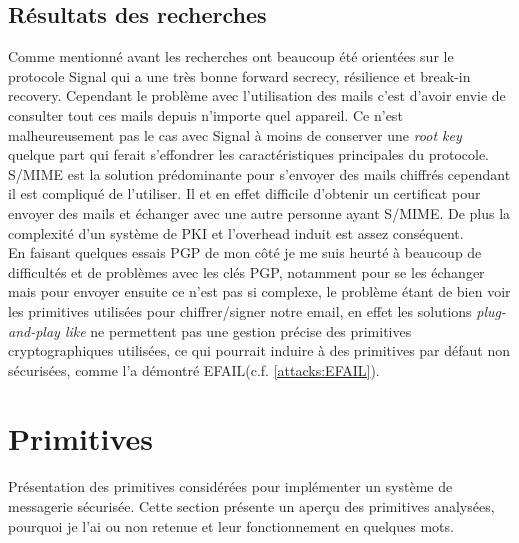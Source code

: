 \subsection{Résultats des recherches}
Comme mentionné avant les recherches ont beaucoup été orientées sur le protocole Signal qui a une très bonne forward secrecy, résilience et break-in recovery. Cependant le problème avec l'utilisation des mails c'est d'avoir envie de consulter tout ces mails depuis n'importe quel appareil. Ce n'est malheureusement pas le cas avec Signal à moins de conserver une \textit{root key} quelque part qui ferait s'effondrer les caractéristiques principales du protocole.\\
S/MIME est la solution prédominante pour s'envoyer des mails chiffrés cependant il est compliqué de l'utiliser. Il et en effet difficile d'obtenir un certificat pour envoyer des mails et échanger avec une autre personne ayant S/MIME. De plus la complexité d'un système de PKI et l'overhead induit est assez conséquent.\\
En faisant quelques essais PGP de mon côté je me suis heurté à beaucoup de difficultés et de problèmes avec les clés PGP, notamment pour se les échanger mais pour envoyer ensuite ce n'est pas si complexe, le problème étant de bien voir les primitives utilisées pour chiffrer/signer notre email, en effet les solutions \textit{plug-and-play like} ne permettent pas une gestion précise des primitives cryptographiques utilisées, ce qui pourrait induire à des primitives par défaut non sécurisées, comme l'a démontré EFAIL(c.f. \ref{attacks:EFAIL}).
\section{Primitives}
Présentation des primitives considérées pour implémenter un système de messagerie sécurisée. Cette section présente un aperçu des primitives analysées, pourquoi je l'ai ou non retenue et leur fonctionnement en quelques mots.
